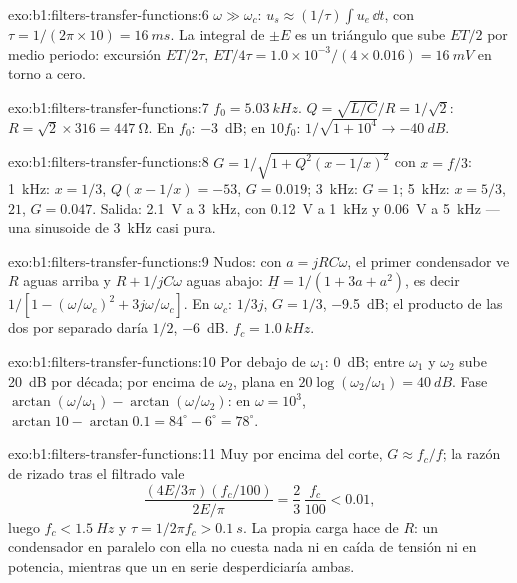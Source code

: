\begin{solution}{exo:b1:filters-transfer-functions:6}
$\omega \gg \omega_c$: $u_s \approx (1/\tau)\int u_e\,\dd t$, con $\tau =
1/(2\pi \times 10) = \qty{16}{ms}$. La integral de $\pm E$ es un triángulo
que sube $ET/2$ por medio periodo: excursión $ET/2\tau$, 
$ET/4\tau = 1.0 \times 10^{-3}/(4 \times 0.016) = \qty{16}{mV}$ en torno a
cero.
\end{solution}

\begin{solution}{exo:b1:filters-transfer-functions:7}
$f_0 = \qty{5.03}{kHz}$. $Q = \sqrt{L/C}/R = 1/\sqrt2$: $R = \sqrt2 \times
316 = \qty{447}{\ohm}$. En $f_0$: \qty{-3}{dB}; en $10f_0$: $1/\sqrt{1 +
10^4} \to \qty{-40}{dB}$.
\end{solution}

\begin{solution}{exo:b1:filters-transfer-functions:8}
$G = 1/\sqrt{1 + Q^2(x - 1/x)^2}$ con $x = f/3$: \qty{1}{kHz}: $x = 1/3$,
$Q(x - 1/x) = -53$, $G = 0.019$; \qty{3}{kHz}: $G = 1$; \qty{5}{kHz}:
$x = 5/3$, $21$, $G = 0.047$. Salida: \qty{2.1}{V} a \qty{3}{kHz}, con
\qty{0.12}{V} a \qty{1}{kHz} y \qty{0.06}{V} a \qty{5}{kHz} --- una
sinusoide de \qty{3}{kHz} casi pura.
\end{solution}

\begin{solution}{exo:b1:filters-transfer-functions:9}
Nudos: con $a = jRC\omega$, el primer condensador ve $R$ aguas arriba y
$R + 1/jC\omega$ aguas abajo: $\underline H = 1/(1 + 3a + a^2)$, es decir
$1/[1 - (\omega/\omega_c)^2 + 3j\omega/\omega_c]$. En $\omega_c$: $1/3j$,
$G = 1/3$, \qty{-9.5}{dB}; el producto de las dos  por separado
daría $1/2$, \qty{-6}{dB}. $f_c = \qty{1.0}{kHz}$.
\end{solution}

\begin{solution}{exo:b1:filters-transfer-functions:10}
Por debajo de $\omega_1$: \qty{0}{dB}; entre $\omega_1$ y $\omega_2$ sube
\qty{20}{dB} por década; por encima de $\omega_2$, plana en
$20\log(\omega_2/\omega_1) = \qty{40}{dB}$. Fase
$\arctan(\omega/\omega_1) - \arctan(\omega/\omega_2)$: en $\omega = 10^3$,
$\arctan 10 - \arctan 0.1 = 84^\circ - 6^\circ = 78^\circ$.
\end{solution}

\begin{solution}{exo:b1:filters-transfer-functions:11}
Muy por encima del corte, $G \approx f_c/f$; la razón de rizado tras el
filtrado vale
\[
\frac{(4E/3\pi)(f_c/100)}{2E/\pi} = \frac{2}{3}\,\frac{f_c}{100} < 0.01,
\]
luego $f_c < \qty{1.5}{Hz}$ y $\tau = 1/2\pi f_c > \qty{0.1}{s}$. La propia carga hace de
$R$: un condensador en paralelo con ella no cuesta nada ni en caída de
tensión ni en potencia, mientras que un  en serie desperdiciaría ambas.
\end{solution}


